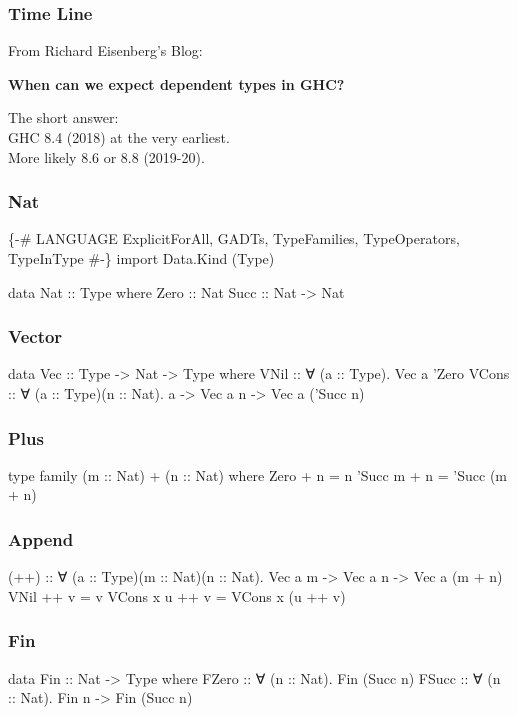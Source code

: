 \documentclass{beamer}
\begin{document}
\begin{frame}\frametitle{Time Line}
From Richard Eisenberg's Blog:

\medskip

\textbf{When can we expect dependent types in GHC?}

\medskip

The short answer:\\
GHC 8.4 (2018) at the very earliest.\\
More likely 8.6 or 8.8 (2019-20).
\end{frame}

\begin{frame}[fragile]\frametitle{Nat}
\begin{semiverbatim}
\{-# LANGUAGE ExplicitForAll, GADTs, TypeFamilies,
             TypeOperators, TypeInType #-\}
import Data.Kind (Type)

data Nat :: Type where
  Zero :: Nat
  Succ :: Nat -> Nat
\end{semiverbatim}
\end{frame}

\begin{frame}[fragile]\frametitle{Vector}
\begin{semiverbatim}
data Vec :: Type -> Nat -> Type where
  VNil  :: ∀ (a :: Type). Vec a 'Zero
  VCons :: ∀ (a :: Type)(n :: Nat).
    a -> Vec a n -> Vec a ('Succ n)
\end{semiverbatim}
\end{frame}

\begin{frame}[fragile]\frametitle{Plus}
\begin{semiverbatim}
type family (m :: Nat) + (n :: Nat) where
  Zero    + n = n
  'Succ m + n = 'Succ (m + n)
\end{semiverbatim}
\end{frame}

\begin{frame}[fragile]\frametitle{Append}
\begin{semiverbatim}
(++) :: ∀ (a :: Type)(m :: Nat)(n :: Nat).
        Vec a m -> Vec a n -> Vec a (m + n)
VNil      ++ v = v
VCons x u ++ v = VCons x (u ++ v)
\end{semiverbatim}
\end{frame}

\begin{frame}[fragile]\frametitle{Fin}
\begin{semiverbatim}
data Fin :: Nat -> Type where
  FZero :: ∀ (n :: Nat).          Fin (Succ n)
  FSucc :: ∀ (n :: Nat). Fin n -> Fin (Succ n)
\end{semiverbatim}
\end{frame}
\end{document}

